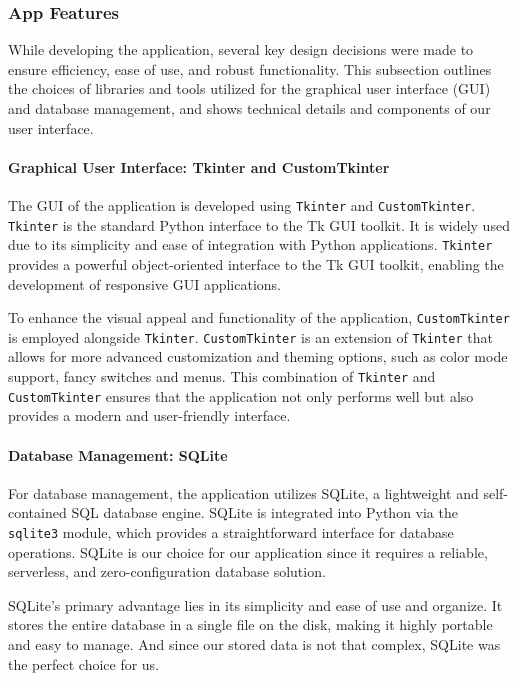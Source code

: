 \subsubsection{App Features}

While developing the application, several key design decisions were made to ensure efficiency, ease of use, and robust functionality. This subsection outlines the choices of libraries and tools utilized for the graphical user interface (GUI) and database management, and shows technical details and components of our user interface.

\paragraph{Graphical User Interface: Tkinter and CustomTkinter}

The GUI of the application is developed using \texttt{Tkinter} and \texttt{CustomTkinter}. \texttt{Tkinter} is the standard Python interface to the Tk GUI toolkit. It is widely used due to its simplicity and ease of integration with Python applications. \texttt{Tkinter} provides a powerful object-oriented interface to the Tk GUI toolkit, enabling the development of responsive GUI applications.

To enhance the visual appeal and functionality of the application, \texttt{CustomTkinter} is employed alongside \texttt{Tkinter}. \texttt{CustomTkinter} is an extension of \texttt{Tkinter} that allows for more advanced customization and theming options, such as color mode support, fancy switches and menus. This combination of \texttt{Tkinter} and \texttt{CustomTkinter} ensures that the application not only performs well but also provides a modern and user-friendly interface.

\paragraph{Database Management: SQLite}

For database management, the application utilizes SQLite, a lightweight and self-contained SQL database engine. SQLite is integrated into Python via the \texttt{sqlite3} module, which provides a straightforward interface for database operations. SQLite is our choice for our application since it requires a reliable, serverless, and zero-configuration database solution.

SQLite's primary advantage lies in its simplicity and ease of use and organize. It stores the entire database in a single file on the disk, making it highly portable and easy to manage. And since our stored data is not that complex, SQLite was the perfect choice for us.

